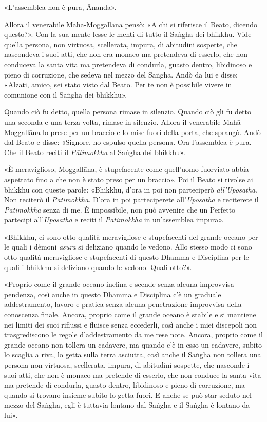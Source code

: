 «L’assemblea non è pura, Ānanda».


Allora il venerabile Mahā-Moggallāna pensò: «A chi si riferisce il
Beato, dicendo questo?». Con la sua mente lesse le menti di tutto il
Saṅgha dei bhikkhu. Vide quella persona, non virtuosa, scellerata,
impura, di abitudini sospette, che nascondeva i suoi atti, che non era
monaco ma pretendeva di esserlo, che non conduceva la santa vita ma
pretendeva di condurla, guasto dentro, libidinoso e pieno di corruzione,
che sedeva nel mezzo del Saṅgha. Andò da lui e disse: «Alzati, amico,
sei stato visto dal Beato. Per te non è possibile vivere in comunione
con il Saṅgha dei bhikkhu».


Quando ciò fu detto, quella persona rimase in silenzio. Quando ciò gli
fu detto una seconda e una terza volta, rimase in silenzio. Allora il
venerabile Mahā-Moggallāna lo prese per un braccio e lo mise fuori della
porta, che sprangò. Andò dal Beato e disse: «Signore, ho espulso quella
persona. Ora l’assemblea è pura. Che il Beato reciti il \emph{Pātimokkha} al
Saṅgha dei bhikkhu».


«È meraviglioso, Moggallāna, è stupefacente come quell’uomo fuorviato
abbia aspettato fino a che non è stato preso per un braccio». Poi il Beato
si rivolse ai bhikkhu con queste parole: «Bhikkhu, d’ora in poi non
parteciperò \emph{all’Uposatha}. Non reciterò il \emph{Pātimokkha}. D’ora in poi
parteciperete all’\emph{Uposatha} e reciterete il \emph{Pātimokkha} senza di me. È
impossibile, non può avvenire che un Perfetto partecipi all’\emph{Uposatha} e
reciti il \emph{Pātimokkha} in un’assemblea impura».


«Bhikkhu, ci sono otto qualità meravigliose e stupefacenti del grande
oceano per le quali i dèmoni \emph{asura} si deliziano quando le vedono. Allo
stesso modo ci sono otto qualità meravigliose e stupefacenti di questo
Dhamma e Disciplina per le quali i bhikkhu si deliziano quando le
vedono. Quali otto?».


«Proprio come il grande oceano inclina e scende senza alcuna improvvisa
pendenza, così anche in questo Dhamma e Disciplina c’è un graduale
addestramento, lavoro e pratica senza alcuna penetrazione improvvisa
della conoscenza finale. Ancora, proprio come il grande oceano è stabile
e si mantiene nei limiti dei suoi riflussi e fluisce senza eccederli,
così anche i miei discepoli non trasgrediscono le regole d’addestramento
da me rese note. Ancora, proprio come il grande oceano non tollera un
cadavere, ma quando c’è in esso un cadavere, subito lo scaglia a riva,
lo getta sulla terra asciutta, così anche il Saṅgha non tollera una
persona non virtuosa, scellerata, impura, di abitudini sospette, che
nasconde i suoi atti, che non è monaco ma pretende di esserlo, che non
conduce la santa vita ma pretende di condurla, guasto dentro, libidinoso
e pieno di corruzione, ma quando si trovano insieme subito lo getta
fuori. E anche se può star seduto nel mezzo del Saṅgha, egli è tuttavia
lontano dal Saṅgha e il Saṅgha è lontano da lui».



